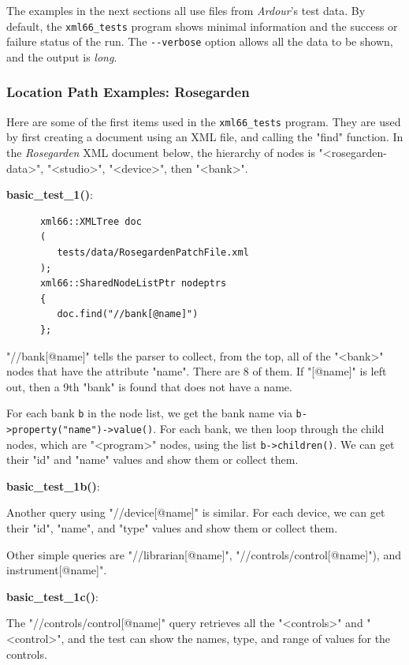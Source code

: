    The examples in the next sections all use files from
   \textsl{Ardour}'s test data.
   By default, the \texttt{xml66\_tests} program shows minimal information
   and the success or failure status of the run.
   The \texttt{-{}-verbose} option allows all the data to be shown,
   and the output is \textsl{long}.

\subsubsection{Location Path Examples: Rosegarden}
\label{subsubsec:xpath_location_path_examples_1}

   Here are some of the first items used in the \texttt{xml66\_tests} program.
   They are used by first creating a document using an XML file,
   and calling the "find" function.
   In the \textsl{Rosegarden} XML document below,
   the hierarchy of nodes is "<rosegarden-data>",
   "<studio>", "<device>", then "<bank>".

   \textbf{basic\_test\_1()}:

   \begin{verbatim}
      xml66::XMLTree doc
      (
         tests/data/RosegardenPatchFile.xml
      );
      xml66::SharedNodeListPtr nodeptrs
      {
         doc.find("//bank[@name]")
      };
   \end{verbatim}

   "//bank[@name]" tells the parser to collect, from the top, all of the
   "<bank>" nodes that have the attribute "name". There are 8 of them.
   If "[@name]" is left out, then a 9th "bank" is found that does not have
   a name.

   For each bank \texttt{b} in the node list, we get the bank name
   via \texttt{b->property("name")->value()}.
   For each bank, we then loop through the child nodes, which are "<program>"
   nodes, using the list \texttt{b->children()}.
   We can get their "id" and "name" values and show them or collect them.

   \textbf{basic\_test\_1b()}:

   Another query using "//device[@name]" is similar.
   For each device, we can get their "id", "name", and "type"
   values and show them or collect them.

   Other simple queries are "//librarian[@name]",
   "//controls/control[@name]"), and
   instrument[@name]".

   \textbf{basic\_test\_1c()}:

   The "//controls/control[@name]"
   query retrieves all the "<controls>" and "<control>",
   and the test can show the names,
   type, and range of values for the controls.


